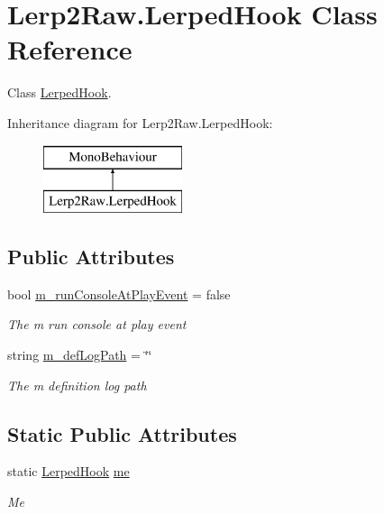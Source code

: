 \hypertarget{class_lerp2_raw_1_1_lerped_hook}{}\section{Lerp2\+Raw.\+Lerped\+Hook Class Reference}
\label{class_lerp2_raw_1_1_lerped_hook}


Class \hyperlink{class_lerp2_raw_1_1_lerped_hook}{Lerped\+Hook}.  


Inheritance diagram for Lerp2\+Raw.\+Lerped\+Hook\+:\begin{figure}[H]
\begin{center}
\leavevmode
\includegraphics[height=2.000000cm]{class_lerp2_raw_1_1_lerped_hook}
\end{center}
\end{figure}
\subsection*{Public Attributes}
\begin{DoxyCompactItemize}
\item 
bool \hyperlink{class_lerp2_raw_1_1_lerped_hook_a61392d7c972a4f71d6ecdd19b203e948}{m\+\_\+run\+Console\+At\+Play\+Event} = false
\begin{DoxyCompactList}\small\item\em The m run console at play event \end{DoxyCompactList}\item 
string \hyperlink{class_lerp2_raw_1_1_lerped_hook_a9b54d718ca47a8ab4f3ae8799d2eebe9}{m\+\_\+def\+Log\+Path} = \char`\"{}\char`\"{}
\begin{DoxyCompactList}\small\item\em The m definition log path \end{DoxyCompactList}\end{DoxyCompactItemize}
\subsection*{Static Public Attributes}
\begin{DoxyCompactItemize}
\item 
static \hyperlink{class_lerp2_raw_1_1_lerped_hook}{Lerped\+Hook} \hyperlink{class_lerp2_raw_1_1_lerped_hook_a2f2611b3846847fc308804e0a687e00b}{me}
\begin{DoxyCompactList}\small\item\em Me \end{DoxyCompactList}\end{DoxyCompactItemize}


